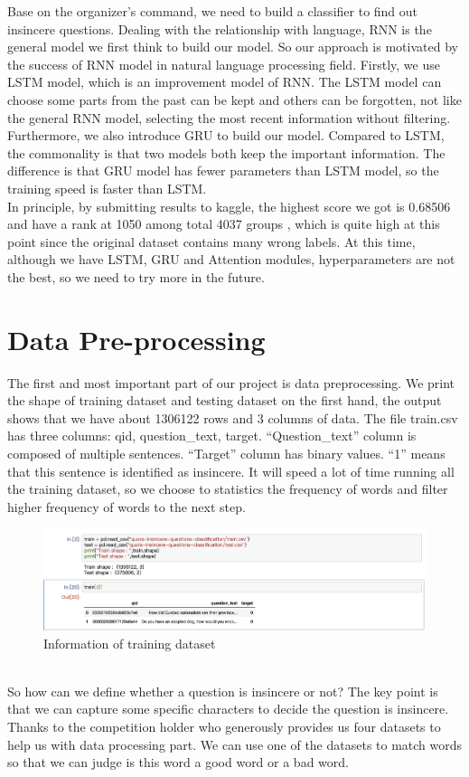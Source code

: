 \documentclass{article}
\begin{document}
\noindent Base on the organizer's command, we need to build a classifier to find out insincere questions. Dealing with the relationship with language, RNN is the general model we first think  to build our model. So our approach is motivated by the success of RNN model in natural language processing field. Firstly, we  use LSTM model, which is an improvement model of RNN. The LSTM model can choose some parts from the past can be kept and others can be forgotten, not like the general RNN model, selecting the most recent information without filtering. Furthermore, we also introduce GRU to build our model. Compared to LSTM, the commonality is that two models both keep the important information. The difference is that GRU model has fewer parameters than LSTM model, so the training speed is faster than LSTM.\\

\noindent In principle, by submitting results to kaggle, the highest score we got is 0.68506 and have a rank at 1050 among total 4037 groups , which is quite high at this point since the original dataset contains many wrong labels. At this time, although we have LSTM, GRU and Attention modules,  hyperparameters are not the best, so we need to try more in the future. \\

\section{ Data Pre-processing}
\noindent The first and most important part of our project is data preprocessing.  We print the shape of training dataset and testing dataset on the first hand, the output shows that we have about 1306122 rows and 3 columns of data. The file train.csv has three columns: qid, question\_text, target. “Question\_text” column is composed of multiple sentences. “Target” column has binary values. “1” means that this sentence is identified as insincere. It will speed a lot of time running all the training dataset, so we choose to statistics the frequency of words and filter higher frequency of words to the next step.\\
\begin{figure}[h]
	\centering
	\includegraphics[scale = 0.15]{n1.jpeg}
	\caption{Information of training dataset
		}
\end{figure}\\
\noindent So how can we define whether a question is insincere or not? The key point is that we can capture some specific characters to decide the question is insincere. Thanks to the competition holder who generously provides us four datasets to help us with data processing part. We can use one of the datasets to match words so that we can judge is this word a good word or a bad word.\\
\end{document}
